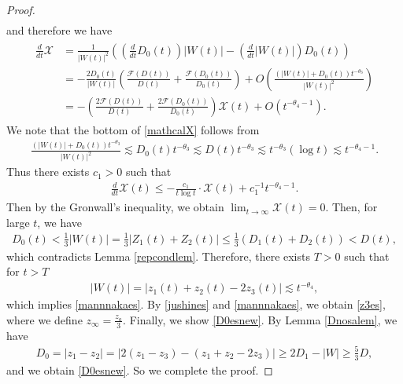 \documentclass[reqno]{amsart}
\theoremstyle{plain}
\theoremstyle{definition}
\numberwithin{equation}{section}
\newcommand{\1}{\mathbbm{1}}
\begin{document}
\begin{proof}
\begin{align*}
\end{align*}
and therefore we have
\begin{align}\label{mathcalX}
\begin{aligned}
\frac{d}{dt}\mathcal{X}&=\frac{1}{|W(t)|^2}\left(\left(\frac{d}{dt}D_0(t)\right)|W(t)|-\left(\frac{d}{dt}|W(t)|\right)D_0(t)\right)
\\
&=-\frac{2D_0(t)}{|W(t)|}\left(\frac{\mathcal{F}(D(t))}{D(t)}+\frac{\mathcal{F}(D_0(t))}{D_0(t)}\right)+O\left(\frac{(|W(t)|+D_0(t))t^{-\theta_3}}{|W(t)|^2}\right)
\\
&=-\left(\frac{2\mathcal{F}(D(t))}{D(t)}+\frac{2\mathcal{F}(D_0(t))}{D_0(t)}\right)\mathcal{X}(t)+O(t^{-\theta_4-1}).
\end{aligned}
\end{align}
We note that the bottom of \eqref{mathcalX} follows from 
\begin{align*}
 \frac{(|W(t)|+D_0(t))t^{-\theta_3}}{|W(t)|^2}\lesssim D_0(t)t^{-\theta_3}\lesssim D(t)t^{-\theta_3}\lesssim t^{-\theta_3}(\log{t})\lesssim t^{-\theta_4-1}.
 \end{align*}
Thus there exists $c_1>0$ such that 
\begin{align*}
\frac{d}{dt}\mathcal{X}(t)\leq -\frac{c_1}{t\log{t}}\cdot \mathcal{X}(t)+c_1^{-1}t^{-\theta_4-1}.
\end{align*}
Then by the Gronwall's inequality, we obtain $\lim_{t\to\infty}\mathcal{X}(t)=0$. Then, for large $t$, we have
\begin{align*}
D_0(t)<\frac{1}{3}|W(t)|=\frac{1}{3}|Z_1(t)+Z_2(t)|\leq \frac{1}{3}(D_1(t)+D_2(t))<D(t),
\end{align*}
which contradicts Lemma \ref{repcondlem}. Therefore, there exists $T>0$ such that for $t>T$
\begin{align*}
|W(t)|=|z_1(t)+z_2(t)-2z_3(t)|\lesssim t^{-\theta_4},
\end{align*}
which implies \eqref{mannnakaes}. By \eqref{jushines} and \eqref{mannnakaes}, we obtain \eqref{z3es}, where we define $z_{\infty}=\frac{z_a}{3}$. Finally, we show \eqref{D0esnew}. By Lemma \ref{Dnosalem}, we have
\begin{align*}
D_0=|z_1-z_2|=|2(z_1-z_3)-(z_1+z_2-2z_3)|\geq 2D_1-|W|\geq \frac{5}{3}D,
\end{align*}
and we obtain \eqref{D0esnew}. So we complete the proof.
\end{proof}
\end{document}
